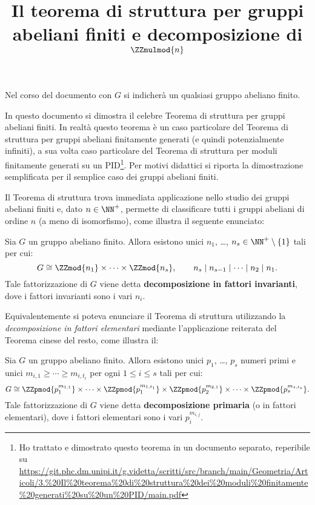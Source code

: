 \documentclass[12pt]{scrartcl}
\begin{document}
	\title{Il teorema di struttura per gruppi abeliani finiti
		e decomposizione di $\ZZmulmod{n}$}
	\maketitle
		
	\begin{note}
		Nel corso del documento con $G$ si indicherà un qualsiasi gruppo abeliano finito.
	\end{note}
	
	In questo documento si dimostra il celebre Teorema di
	struttura per gruppi abeliani finiti. In realtà questo
	teorema è un caso particolare del Teorema di struttura
	per gruppi abeliani finitamente generati (e quindi
	potenzialmente infiniti), a sua volta caso particolare
	del Teorema di struttura per moduli finitamente generati
	su un PID\footnote{
		Ho trattato e dimostrato questo teorema in un documento
		separato, reperibile su
		\url{https://git.phc.dm.unipi.it/g.videtta/scritti/src/branch/main/Geometria/Articoli/3.\%20Il\%20teorema\%20di\%20struttura\%20dei\%20moduli\%20finitamente\%20generati\%20su\%20un\%20PID/main.pdf}
	}. Per motivi didattici si riporta la dimostrazione semplificata
	per il semplice caso dei gruppi abeliani finiti. \medskip
	
	
	Il Teorema di struttura trova immediata applicazione nello
	studio dei gruppi abeliani finiti e, dato $n \in \NN^+$, permette di classificare tutti i gruppi abeliani di ordine $n$ (a meno
	di isomorfismo), come illustra il seguente enunciato:
	
	\begin{theorem}
		Sia $G$ un gruppo abeliano finito. Allora esistono unici
		$n_1$, \ldots, $n_s \in \NN^+ \setminus \{1\}$ tali per cui:
		\[ G \cong \ZZmod{n_1} \times \cdots \times \ZZmod{n_s}, \qquad n_s \mid n_{s-1} \mid \cdots \mid n_2 \mid n_1. \]
		Tale fattorizzazione di $G$ viene detta
		\textbf{decomposizione in fattori invarianti}, dove
		i fattori invarianti sono i vari $n_i$.
	\end{theorem}
	
	Equivalentemente si poteva enunciare il Teorema di struttura
	utilizzando la \textit{decomposizione in fattori elementari}
	mediante l'applicazione reiterata del Teorema cinese del
	resto, come illustra il:
	
	\begin{theorem}
		Sia $G$ un gruppo abeliano finito. Allora esistono unici
		$p_1$, \ldots, $p_s$ numeri primi e unici $m_{i,1} \geq \cdots \geq m_{i,t_i}$ per ogni $1 \leq i \leq s$ tali per cui:
		\[ G \cong \ZZpmod{p_1^{m_{1,1}}} \times \cdots \times \ZZpmod{p_1^{m_{1,t_1}}} \times \ZZpmod{p_2^{m_{2,1}}} \times \cdots \times \ZZpmod{p_s^{m_{s,t_s}}}. \]
		Tale fattorizzazione di $G$ viene detta
		\textbf{decomposizione primaria} (o in fattori
		elementari), dove i fattori elementari sono i vari $p_i^{m_{i,j}}$.
	\end{theorem}
	
\end{document}
